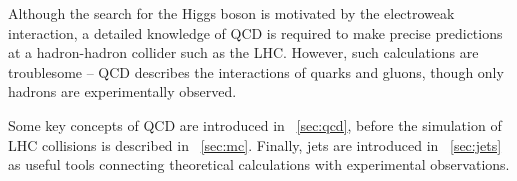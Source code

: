 
Although the search for the Higgs boson is motivated by the electroweak interaction, a
detailed knowledge of \ac{QCD} is required to make precise predictions at a hadron-hadron
collider such as the LHC. However, such calculations are troublesome -- \ac{QCD} describes 
the interactions of quarks and gluons, though only hadrons are experimentally observed.

Some key concepts of \ac{QCD} are introduced in \Section~\ref{sec:qcd}, before the 
simulation of LHC collisions is described in \Section~\ref{sec:mc}. Finally, jets are 
introduced in \Section~\ref{sec:jets} as useful tools connecting theoretical calculations 
with experimental observations.
